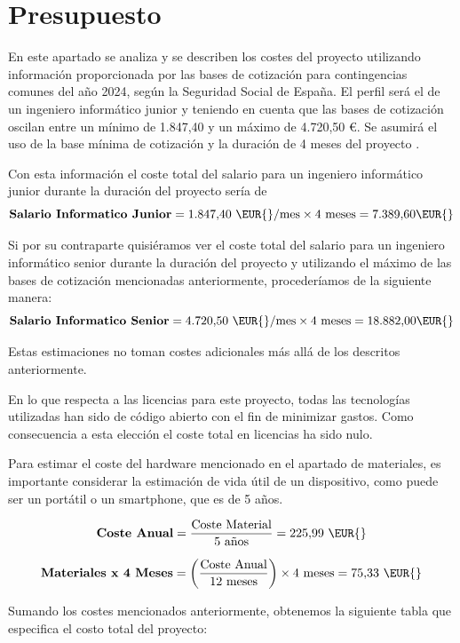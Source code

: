 \renewcommand{\arraystretch}{1}

\section{Presupuesto}

En este apartado se analiza y se describen los costes del proyecto utilizando información proporcionada por las bases de cotización para contingencias comunes del año 2024, según la Seguridad Social de España. El perfil será el de un ingeniero informático junior y teniendo en cuenta que las bases de cotización oscilan entre un mínimo de 1.847,40 \EUR{} y un máximo de 4.720,50 €. Se asumirá el uso de la base mínima de cotización y la duración de 4 meses del proyecto \cite{seguridad_social}.

Con esta información el coste total del salario para un ingeniero informático junior durante la duración del proyecto sería de
\[
    \textbf{Salario Informatico Junior} = 1.847{,}40 \text{ \EUR{}/mes} \times 4 \text{ meses} = 7.389{,}60 \text{\EUR{}}
\]


Si por su contraparte quisiéramos ver el coste total del salario para un ingeniero informático senior durante la duración del proyecto y utilizando el máximo de las bases de cotización mencionadas anteriormente, procederíamos de la siguiente manera:
\[
    \textbf{Salario Informatico Senior} = 4.720{,}50 \text{ \EUR{}/mes} \times 4 \text{ meses} = 18.882{,}00 \text{\EUR{}}
\]

Estas estimaciones no toman costes adicionales más allá de los descritos anteriormente.

En lo que respecta a las licencias para este proyecto, todas las tecnologías utilizadas han sido de código abierto con el fin de minimizar gastos. Como consecuencia a esta elección el coste total en licencias ha sido nulo.

Para estimar el coste del hardware mencionado en el apartado de materiales, es importante considerar la estimación de vida útil de un dispositivo, como puede ser un portátil o un smartphone, que es de 5 años.

\[
    \textbf{Coste Anual} = \frac{\text{Coste Material}}{5 \text{ años}} = 225{,}99 \text{ \EUR{}}
\]

\[
    \textbf{Materiales x 4 Meses} = \left( \frac{\text{Coste Anual}}{12 \text{ meses}} \right) \times 4 \text{ meses} = 75{,}33 \text{ \EUR{}}
\]

Sumando los costes mencionados anteriormente, obtenemos la siguiente tabla que especifica el costo total del proyecto:

